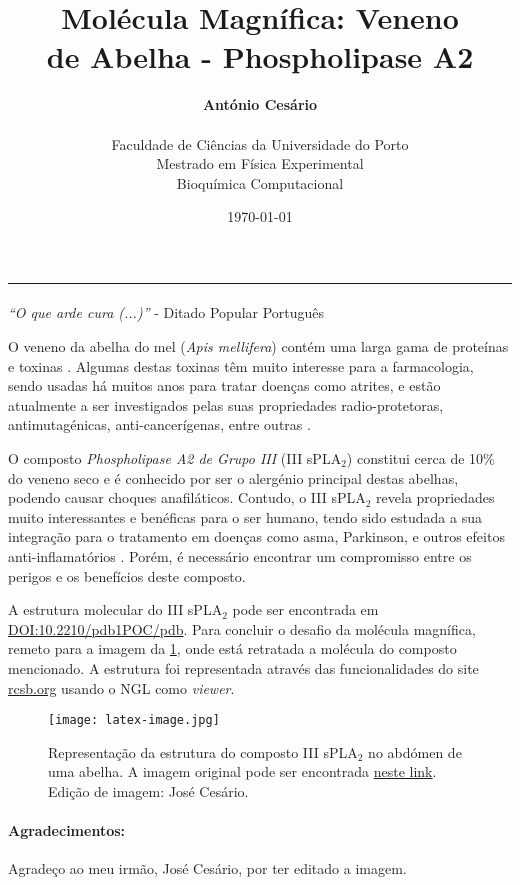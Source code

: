 \documentclass[12pt,a4paper]{article}
\title{\textbf{Molécula Magnífica: Veneno\\de Abelha - Phospholipase A2}}
\author{\textbf{António Cesário}\\\\%
	Faculdade de Ciências da Universidade do Porto\\%
	Mestrado em Física Experimental\\%
	Bioquímica Computacional%
}
\date{\today}
\begin{document}
\maketitle
\noindent\rule{\textwidth}{0.4pt}
\paragraph{}

\begin{flushright}\textit{``O que arde cura (...)''} - Ditado Popular Português\end{flushright}

O veneno da abelha do mel (\textit{Apis mellifera}) contém uma larga gama de proteínas e toxinas \cite{HoneybeeVenomRich,sonTherapeuticApplicationAntiarthritis2007}. Algumas destas toxinas têm muito interesse para a farmacologia, sendo usadas há muitos anos para tratar doenças como atrites, e estão atualmente a ser investigados pelas suas propriedades radio-protetoras, antimutagénicas, anti-cancerígenas, entre outras \cite{leeBeeVenomPhospholipase2016}.

O composto \textit{Phospholipase A2 de Grupo III} (III sPLA$_2$) constitui cerca de 10\% do veneno seco e é conhecido por ser o alergénio principal destas abelhas, podendo causar choques anafiláticos. Contudo, o III sPLA$_2$ revela propriedades muito interessantes e benéficas para o ser humano, tendo sido estudada a sua integração para o tratamento em doenças como asma, Parkinson, e outros efeitos anti-inflamatórios \cite{leeBeeVenomPhospholipase2016}. Porém, é necessário encontrar um compromisso entre os perigos e os benefícios deste composto.

A estrutura molecular do III sPLA$_2$ pode ser encontrada em \href{https://www.rcsb.org/structure/1POC}{DOI:10.2210/pdb1POC/pdb}. Para concluir o desafio da molécula magnífica, remeto para a imagem da \cref{fig:}, onde está retratada a molécula do composto mencionado. A estrutura foi representada através das funcionalidades do site \href{https://www.rcsb.org/3d-view/ngl/1poc}{rcsb.org} usando o NGL como \textit{viewer}.

\begin{figure}[H]
	\centering
	\texttt{[image: latex-image.jpg]}
	\caption{Representação da estrutura do composto III sPLA$_2$ no abdómen de uma abelha. A imagem original pode ser encontrada \href{https://post.healthline.com/wp-content/uploads/2020/08/732x549_How_Is_An_Infected_Bee_Sting_Treated-1-732x549.jpg}{neste link}. Edição de imagem: José Cesário.}
	\label{fig:}
\end{figure} 


\paragraph{Agradecimentos:} Agradeço ao meu irmão, José Cesário, por ter editado a imagem.


\end{document}
